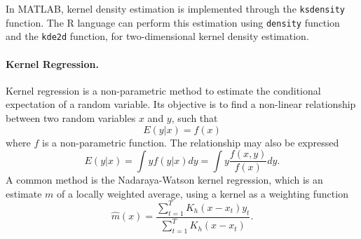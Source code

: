 In MATLAB, kernel density estimation is implemented through the \texttt{ksdensity} function. The R language can perform this estimation using \texttt{density} function and the \texttt{kde2d} function, for two-dimensional kernel density estimation.

\paragraph{Kernel Regression.} Kernel regression is a non-parametric method to estimate the conditional expectation of a random variable. Its objective is to find a non-linear relationship between two random variables $x$ and $y$, such that
\[
E(y | x) = f(x)
\]
where $f$ is a non-parametric function. The relationship may also be expressed
\[
E(y | x) = \int y f(y|x) dy = \int y \frac{f(x,y)}{f(x)} dy.
\]
A common method is the Nadaraya-Watson kernel regression, which is an estimate $m$ of a locally weighted average, using a kernel as a weighting function
\[
\widehat{m}(x)=\frac{\sum_{t=1}^T K_h(x-x_t)y_t }{\sum_{t=1}^T K_h(x-x_t)}.
\]


